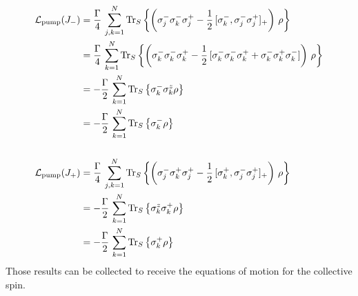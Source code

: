     \begin{align*}
        \mathcal{L}_\text{pump}(J_-)&=\frac{\Gamma}{4}\,\sum_{j,k=1}^N \text{Tr}_S\left\{\left( \sigma_j^- \sigma_k^- \sigma_j^+ -\frac{1}{2}\,[\sigma_k^-,\sigma_j^-\sigma_j^+]_+   \right)\,\rho\right\}\\
        &=\frac{\Gamma}{4}\,\sum_{k=1}^N \text{Tr}_S\left\{\left( \sigma_k^- \sigma_k^- \sigma_k^+ -\frac{1}{2}\,[\sigma_k^-\sigma_k^-\sigma_k^++\sigma_k^-\sigma_k^+\sigma_k^-]   \right)\,\rho\right\}\\
        &=-\frac{\Gamma}{2}\,\sum_{k=1}^N\text{Tr}_S\left\{\sigma_k^-\sigma_k^z\rho\right\}\\
        &=-\frac{\Gamma}{2}\,\sum_{k=1}^N\text{Tr}_S\left\{\sigma_k^-\rho\right\}\\\\
        \mathcal{L}_\text{pump}(J_+)&=\frac{\Gamma}{4}\,\sum_{j,k=1}^N \text{Tr}_S\left\{\left( \sigma_j^- \sigma_k^+ \sigma_j^+ -\frac{1}{2}\,[\sigma_k^+,\sigma_j^-\sigma_j^+]_+   \right)\,\rho\right\}\\
        &=-\frac{\Gamma}{2}\,\sum_{k=1}^N\text{Tr}_S\left\{\sigma_k^z\sigma_k^+\rho\right\}\\
        &=-\frac{\Gamma}{2}\,\sum_{k=1}^N\text{Tr}_S\left\{\sigma_k^+\rho\right\}
    \end{align*}
    Those results can be collected to receive the equations of motion for the collective spin.
    
